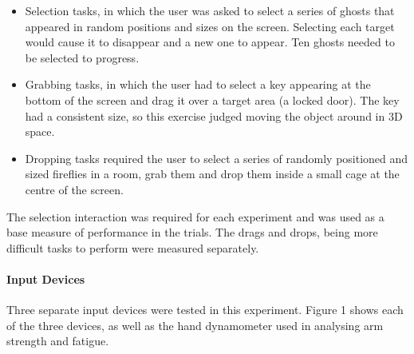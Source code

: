 \begin{itemize}
\item Selection tasks, in which the user was asked to select a
series of ghosts that appeared in random positions and sizes
on the screen. Selecting each target would cause it to
disappear and a new one to appear. Ten ghosts needed to be
selected to progress.
\item Grabbing tasks, in which the user had to select a key
appearing at the bottom of the screen and drag it over a
target area (a locked door). The key had a consistent size, so
this exercise judged moving the object around in 3D space.
\item Dropping tasks required the user to select a series of
randomly positioned and sized fireflies in a room, grab them
and drop them inside a small cage at the centre of the
screen.
\end{itemize}

The selection interaction was required for each experiment and was used as a base measure of performance in the trials. The drags and drops, being more difficult tasks to perform were measured separately.

\paragraph{Input Devices}
Three separate input devices were tested in this experiment. Figure 1 shows each of the three devices, as well as the hand
dynamometer used in analysing arm strength and fatigue. 

